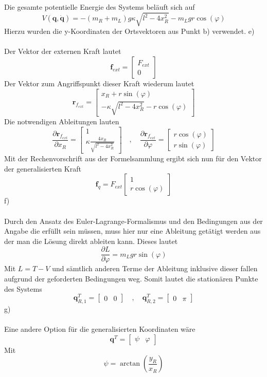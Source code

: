 Die gesamte potentielle Energie des Systems beläuft sich auf
\[
	V(\textbf{q},\dot{\textbf{q}}) = -(m_R + m_L)g\kappa\sqrt{l^2 - 4x_R^2} - m_Lgr\cos(\varphi)
\]
Hierzu wurden die y-Koordinaten der Ortsvektoren aus Punkt b) verwendet.
\newpage
\noindent
e)\\ \\
Der Vektor der externen Kraft lautet
\[
	\textbf{f}_{ext} = \begin{bmatrix}
		F_{ext} \\
		0
	\end{bmatrix}
\]
Der Vektor zum Angriffspunkt dieser Kraft wiederum lautet
\[
	\textbf{r}_{f_{ext}} = \begin{bmatrix}
		x_R + r\sin(\varphi) \\
		-\kappa\sqrt{l^2 - 4x_R^2} - r\cos(\varphi)
	\end{bmatrix}
\]
Die notwendigen Ableitungen lauten
\[
	\frac{\partial 	\textbf{r}_{f_{ext}}}{\partial x_R} = \begin{bmatrix}
		1 \\
		\kappa\frac{4x_R}{\sqrt{l^2 - 4x_R^2}}
	\end{bmatrix}
	\quad,\quad
		\frac{\partial 	\textbf{r}_{f_{ext}}}{\partial \varphi} = \begin{bmatrix}
		r\cos(\varphi) \\
		r\sin(\varphi)
	\end{bmatrix}
\]
Mit der Rechenvorschrift aus der Formelsammlung ergibt sich nun für den Vektor der generalisierten Kraft
\[
	\textbf{f}_q = F_{ext}\begin{bmatrix}
		1 \\
		r\cos(\varphi)
	\end{bmatrix}
\]
f)\\ \\
Durch den Ansatz des Euler-Lagrange-Formalismus und den Bedingungen aus der Angabe die erfüllt sein müssen, muss hier nur eine Ableitung getätigt werden aus der man die Lösung direkt ableiten kann. Dieses lautet 
\[
	\frac{\partial L}{\partial \varphi} = m_Lgr\sin(\varphi)
\]
Mit $L = T - V$ und sämtlich anderen Terme der Ableitung inklusive dieser fallen aufgrund der geforderten Bedingungen weg. Somit lautet die stationären Punkte des Systems
\[
	\textbf{q}_{R,1}^T = \begin{bmatrix}
		0 & 0
	\end{bmatrix}
	\quad,\quad
	\textbf{q}_{R,2}^T = \begin{bmatrix}
	0 & \pi
	\end{bmatrix}
\]
g)\\ \\
Eine andere Option für die generalisierten Koordinaten wäre
\[
	\textbf{q}^T = \begin{bmatrix}
		\psi & \varphi
	\end{bmatrix}
\]
Mit
\[
	\psi = \arctan\left(\frac{y_R}{x_R}\right)
\]